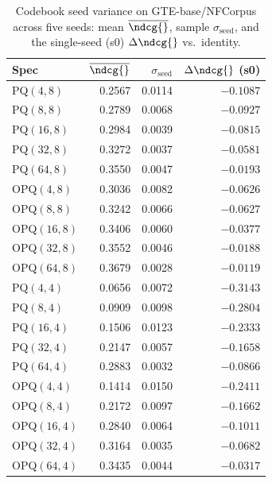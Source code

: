 \begin{table}[t]
\centering
\small
\caption{Codebook seed variance on GTE-base/NFCorpus across five seeds: mean $\overline{\ndcg{}}$, sample $\sigma_{\text{seed}}$, and the single-seed (s0) $\Delta\ndcg{}$ vs.\ identity.}
\label{tab:seed-variance-gte-base-nfcorpus}
\begin{tabular}{lrrr}
\toprule
Spec & $\overline{\ndcg{}}$ & $\sigma_{\text{seed}}$ & $\Delta\ndcg{}$ (s0) \\
\midrule
PQ$(4,8)$ & 0.2567 & 0.0114 & $-0.1087$ \\
PQ$(8,8)$ & 0.2789 & 0.0068 & $-0.0927$ \\
PQ$(16,8)$ & 0.2984 & 0.0039 & $-0.0815$ \\
PQ$(32,8)$ & 0.3272 & 0.0037 & $-0.0581$ \\
PQ$(64,8)$ & 0.3550 & 0.0047 & $-0.0193$ \\
OPQ$(4,8)$ & 0.3036 & 0.0082 & $-0.0626$ \\
OPQ$(8,8)$ & 0.3242 & 0.0066 & $-0.0627$ \\
OPQ$(16,8)$ & 0.3406 & 0.0060 & $-0.0377$ \\
OPQ$(32,8)$ & 0.3552 & 0.0046 & $-0.0188$ \\
OPQ$(64,8)$ & 0.3679 & 0.0028 & $-0.0119$ \\
PQ$(4,4)$ & 0.0656 & 0.0072 & $-0.3143$ \\
PQ$(8,4)$ & 0.0909 & 0.0098 & $-0.2804$ \\
PQ$(16,4)$ & 0.1506 & 0.0123 & $-0.2333$ \\
PQ$(32,4)$ & 0.2147 & 0.0057 & $-0.1658$ \\
PQ$(64,4)$ & 0.2883 & 0.0032 & $-0.0866$ \\
OPQ$(4,4)$ & 0.1414 & 0.0150 & $-0.2411$ \\
OPQ$(8,4)$ & 0.2172 & 0.0097 & $-0.1662$ \\
OPQ$(16,4)$ & 0.2840 & 0.0064 & $-0.1011$ \\
OPQ$(32,4)$ & 0.3164 & 0.0035 & $-0.0682$ \\
OPQ$(64,4)$ & 0.3435 & 0.0044 & $-0.0317$ \\
\bottomrule
\end{tabular}
\end{table}


